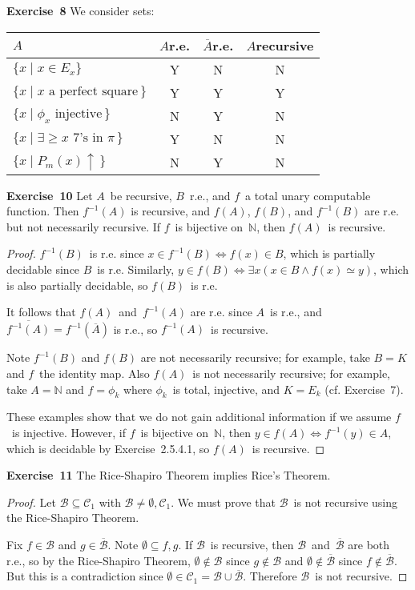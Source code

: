 \documentclass[letterpaper]{article}
\newcommand{\exercise}[2][]{\noindent\textbf{Exercise~{#2}}\ifthenelse{\isempty{#1}}{\textbf{.}}{ ({#1})\textbf{.}}}
\newcommand{\B}{\mathcal{B}}
\newcommand{\C}{\mathcal{C}}
\newcommand{\N}{\mathbb{N}}
\newcommand{\union}{\cup}
\theoremstyle{plain}
\theoremstyle{definition}
\theoremstyle{remark}
\begin{document}
\exercise{8}
We consider sets:
\begin{center}
\begin{tabular}{|l|c|c|c|}
\hline
$A$&$A$\quad r.e.&$\overline{A}$\quad r.e.&$A$\quad recursive\\
\hline
$\{x\mid x\in E_x\}$&Y&N&N\\
$\{x\mid x\text{ a perfect square}\,\}$&Y&Y&Y\\
$\{x\mid\phi_x\text{ injective}\,\}$&N&Y&N\\
$\{x\mid\exists\ge x\text{ 7's in }\pi\,\}$&Y&N&N\\
$\{x\mid P_m(x)\uparrow\,\}$&N&Y&N\\
\hline
\end{tabular}
\end{center}

\exercise{10}
Let $A$~be recursive, $B$~r.e., and $f$~a total unary computable function. Then $f^{-1}(A)$ is recursive, and $f(A)$, $f(B)$, and $f^{-1}(B)$ are r.e. but not necessarily recursive. If $f$~is bijective on~$\N$, then $f(A)$~is recursive.
\begin{proof}
$f^{-1}(B)$~is r.e. since $x\in f^{-1}(B)\iff f(x)\in B$, which is partially decidable since $B$~is r.e. Similarly, $y\in f(B)\iff\exists x(x\in B\land f(x)\simeq y)$, which is also partially decidable, so $f(B)$~is r.e.

It follows that $f(A)$~and~$f^{-1}(A)$ are r.e. since $A$~is r.e., and $\overline{f^{-1}(A)}=f^{-1}(\overline{A})$ is r.e., so $f^{-1}(A)$~is recursive.

Note $f^{-1}(B)$ and $f(B)$ are not necessarily recursive; for example, take $B=K$ and $f$~the identity map. Also $f(A)$~is not necessarily recursive; for example, take $A=\N$ and $f=\phi_k$ where $\phi_k$~is total, injective, and $K=E_k$ (cf. Exercise~7).

These examples show that we do not gain additional information if we assume $f$~is injective. However, if $f$~is bijective on~$\N$, then $y\in f(A)\iff f^{-1}(y)\in A$, which is decidable by Exercise~2.5.4.1, so $f(A)$~is recursive.
\end{proof}

\exercise[Rice-Shapiro]{11}
The Rice-Shapiro Theorem implies Rice's Theorem.
\begin{proof}
Let $\B\subseteq\C_1$ with $\B\ne\emptyset,\C_1$. We must prove that $\B$~is not recursive using the Rice-Shapiro Theorem.

Fix $f\in\B$ and $g\in\overline{\B}$. Note $\emptyset\subseteq f,g$. If $\B$~is recursive, then $\B$~and~$\overline{\B}$ are both r.e., so by the Rice-Shapiro Theorem, $\emptyset\not\in\B$ since $g\not\in\B$ and $\emptyset\not\in\overline{\B}$ since $f\not\in\overline{\B}$. But this is a contradiction since $\emptyset\in\C_1=\B\union\overline{\B}$. Therefore $\B$~is not recursive.
\end{proof}
\end{document}
